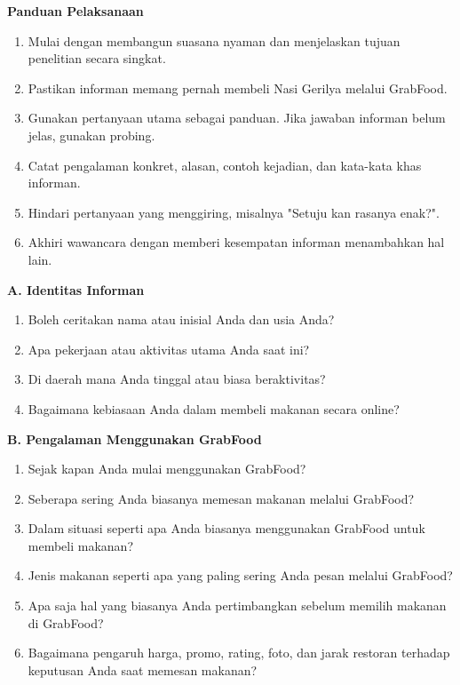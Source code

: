 \documentclass[10pt,a4paper]{article}
\newcommand{\sectionbar}[1]{%
  \Needspace{5\baselineskip}
  \vspace{4mm}
  \noindent\colorbox{Soft}{%
    \parbox{\dimexpr\linewidth-2\fboxsep\relax}{%
      \large\bfseries\textcolor{Primary}{#1}
    }%
  }\par\vspace{1mm}
}
\newcommand{\probe}[1]{%
  \vspace{1mm}
  \noindent{\small\textbf{\textcolor{Accent}{Probing:}} \textcolor{TextGray}{#1}}\par
}
\begin{document}
\sectionbar{Panduan Pelaksanaan}
\begin{enumerate}[label=\arabic*.,leftmargin=*,itemsep=1mm]
\item Mulai dengan membangun suasana nyaman dan menjelaskan tujuan penelitian secara singkat.
\item Pastikan informan memang pernah membeli Nasi Gerilya melalui GrabFood.
\item Gunakan pertanyaan utama sebagai panduan. Jika jawaban informan belum jelas, gunakan probing.
\item Catat pengalaman konkret, alasan, contoh kejadian, dan kata-kata khas informan.
\item Hindari pertanyaan yang menggiring, misalnya "Setuju kan rasanya enak?".
\item Akhiri wawancara dengan memberi kesempatan informan menambahkan hal lain.
\end{enumerate}

\sectionbar{A. Identitas Informan}
\begin{enumerate}[label=\arabic*.,leftmargin=*,itemsep=1.2mm]
\item Boleh ceritakan nama atau inisial Anda dan usia Anda?
\item Apa pekerjaan atau aktivitas utama Anda saat ini?
\item Di daerah mana Anda tinggal atau biasa beraktivitas?
\item Bagaimana kebiasaan Anda dalam membeli makanan secara online?
\end{enumerate}
\probe{Jika perlu, gali pola aktivitas harian, lokasi pemesanan, dan kebiasaan makan informan.}

\sectionbar{B. Pengalaman Menggunakan GrabFood}
\begin{enumerate}[label=\arabic*.,leftmargin=*,itemsep=1.2mm,resume]
\item Sejak kapan Anda mulai menggunakan GrabFood?
\item Seberapa sering Anda biasanya memesan makanan melalui GrabFood?
\item Dalam situasi seperti apa Anda biasanya menggunakan GrabFood untuk membeli makanan?
\item Jenis makanan seperti apa yang paling sering Anda pesan melalui GrabFood?
\item Apa saja hal yang biasanya Anda pertimbangkan sebelum memilih makanan di GrabFood?
\item Bagaimana pengaruh harga, promo, rating, foto, dan jarak restoran terhadap keputusan Anda saat memesan makanan?
\end{enumerate}
\probe{Tanyakan contoh pesanan terakhir, alasan memilih GrabFood, dan faktor yang paling dominan.}
\end{document}
